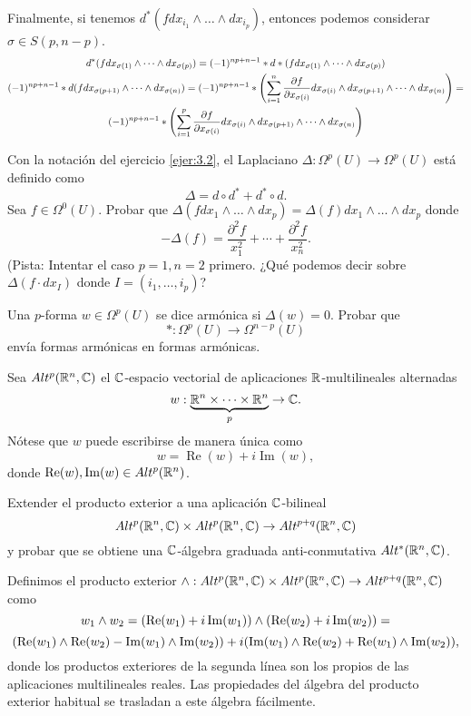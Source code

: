 \documentclass[twoside]{article}
\begin{document}
\begin{solucion}
Finalmente, si tenemos $d^*(fdx_{i_1}\land\dots\land dx_{i_p})$, entonces podemos considerar $\sigma\in S(p,n-p)$.
\begin{gather*}
d^*(fdx_{\sigma(1)}\land\dots\land dx_{\sigma(p)})=(-1)^{np+n-1}*d*(f dx_{\sigma(1)}\land\dots\land dx_{\sigma(p)})\\
(-1)^{np+n-1}*d(fdx_{\sigma(p+1)}\land\dots\land dx_{\sigma(n)})=(-1)^{np+n-1}*\left(\sum_{i=1}^n\frac{\partial f}{\partial x_{\sigma(i)}}dx_{\sigma(i)}\land dx_{\sigma(p+1)}\land\dots\land dx_{\sigma(n)}\right)=\\
(-1)^{np+n-1}*\left(\sum_{i=1}^p\frac{\partial f}{\partial x_{\sigma(i)}}dx_{\sigma(i)}\land dx_{\sigma(p+1)}\land\dots\land dx_{\sigma(n)}\right)
\end{gather*}

\end{solucion}
\newpage

\begin{ejercicio}{3.3}
Con la notación del ejercicio \ref{ejer:3.2}, el Laplaciano $\Delta:\Omega^p(U)\to\Omega^p(U)$ está definido como
\[
\Delta=d\circ d^*+d^*\circ d.
\]
Sea $f\in\Omega^0(U)$. Probar que $\Delta(f dx_1\land\dots\land dx_p)=\Delta(f)dx_1\land\dots\land dx_p$ donde
\[
-\Delta(f)=\frac{\partial^2 f}{x_1^2}+\cdots+\frac{\partial^2 f}{x_n^2}.
\]
(Pista: Intentar el caso $p=1,n=2$ primero. ¿Qué podemos decir sobre $\Delta(f\cdot dx_I)$ donde $I=(i_1,\dots, i_p)$?

Una $p$-forma $w\in\Omega^p(U)$ se dice armónica si $\Delta(w)=0$. Probar que
\[
*:\Omega^p(U)\to \Omega^{n-p}(U)
\]
envía formas armónicas en formas armónicas.
\end{ejercicio}
\begin{solucion}
\end{solucion}
\newpage

\begin{ejercicio}{3.4}
Sea $Alt^p(\mathbb{R}^n,\mathbb{C})$ el $\mathbb{C}$-espacio vectorial de aplicaciones $\mathbb{R}$-multilineales alternadas 
\[
w:\underbrace{\mathbb{R}^n\times\dots\times\mathbb{R}^n}_{p}\to\mathbb{C}.
\]
Nótese que $w$ puede escribirse de manera única como
\[
w=\operatorname{Re}(w)+i\operatorname{Im}(w),
\]
donde $\operatorname{Re}(w),\operatorname{Im}(w)\in Alt^p(\mathbb{R}^n)$.

Extender el producto exterior a una aplicación $\mathbb{C}$-bilineal 
\[
Alt^p(\mathbb{R}^n,\mathbb{C})\times Alt^p(\mathbb{R}^n,\mathbb{C})\to Alt^{p+q}(\mathbb{R}^n,\mathbb{C})
\]
y probar que se obtiene una $\mathbb{C}$-álgebra graduada anti-conmutativa $Alt^*(\mathbb{R}^n,\mathbb{C})$.
\end{ejercicio}
\begin{solucion}
Definimos el producto exterior $\land: Alt^p(\mathbb{R}^n,\mathbb{C})\times Alt^p(\mathbb{R}^n,\mathbb{C})\to Alt^{p+q}(\mathbb{R}^n,\mathbb{C})$ como 
\[
w_1\land w_2=(\operatorname{Re}(w_1)+i\operatorname{Im}(w_1))\land(\operatorname{Re}(w_2)+i\operatorname{Im}(w_2))=
\]
\[
(\operatorname{Re}(w_1)\land\operatorname{Re}(w_2)-\operatorname{Im}(w_1)\land\operatorname{Im}(w_2))+i(\operatorname{Im}(w_1)\land\operatorname{Re}(w_2)+\operatorname{Re}(w_1)\land\operatorname{Im}(w_2)),
\]
donde los productos exteriores de la segunda línea son los propios de las aplicaciones multilineales reales. Las propiedades del álgebra del producto exterior habitual se trasladan a este álgebra fácilmente.
\end{solucion}
\end{document}
